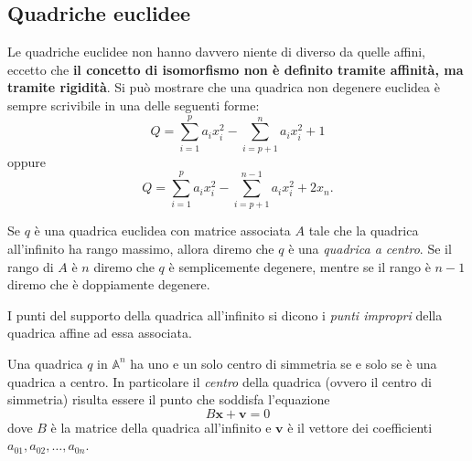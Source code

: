 \documentclass[11pt]{scrartcl}
\renewcommand{\AA}{\mathbb{A}}
\begin{document}
	\subsection{Quadriche euclidee}
	Le quadriche euclidee non hanno davvero niente di diverso da quelle affini, eccetto che \textbf{il concetto di isomorfismo non è definito tramite affinità, ma tramite rigidità}. Si può mostrare che una quadrica non degenere euclidea è sempre scrivibile in una delle seguenti forme:
	$$Q=\sum_{i=1}^p a_ix_i^2-\sum_{i=p+1}^n a_ix_i^2 +1$$
	oppure 
	$$Q=\sum_{i=1}^{p} a_ix_i^2-\sum_{i=p+1}^{n-1}a_ix_i^2 +2x_n.$$ 
	\begin{definition}
		Se $q$ è una quadrica euclidea con matrice associata $A$ tale che la quadrica all'infinito ha rango massimo, allora diremo che $q$ è una \textit{quadrica a centro}. Se il rango di $A$ è $n$ diremo che $q$ è semplicemente degenere, mentre se il rango è $n-1$ diremo che è doppiamente degenere.
	\end{definition}
	\begin{definition}
		I punti del supporto della quadrica all'infinito si dicono i \textit{punti impropri} della quadrica affine ad essa associata.
	\end{definition}
	\begin{proposition}
		Una quadrica $q$ in $\AA^n$ ha uno e un solo centro di simmetria se e solo se è una quadrica a centro. In particolare il \textit{centro} della quadrica (ovvero il centro di simmetria) risulta essere il punto che soddisfa l'equazione
		$$B\mathbf{x}+\mathbf{v}=0$$
		dove $B$ è la matrice della quadrica all'infinito e $\mathbf{v}$ è il vettore dei coefficienti $a_{01},a_{02},\dots,a_{0n}$.
	\end{proposition}
\end{document}
